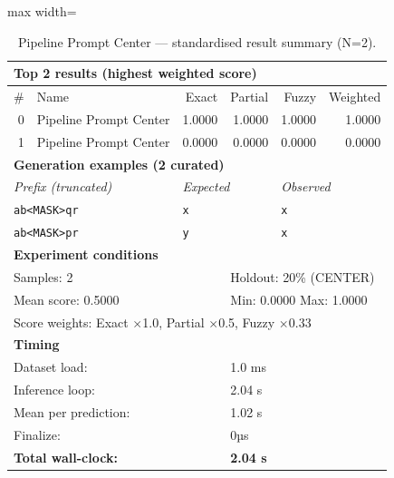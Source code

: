 \begin{table}[htbp]
\centering
\caption{Pipeline Prompt Center — standardised result summary (N=2).}
\label{tab:pipeline_prompt_center_summary}
\begin{adjustbox}{max width=\textwidth}
\begin{tabular}{r p{5cm} r r r r}
\toprule
\multicolumn{6}{l}{\textbf{Top 2 results (highest weighted score)}} \\
\midrule
\# & Name & Exact & Partial & Fuzzy & Weighted \\
\midrule
0 & Pipeline Prompt Center & 1.0000 & 1.0000 & 1.0000 & 1.0000 \\
1 & Pipeline Prompt Center & 0.0000 & 0.0000 & 0.0000 & 0.0000 \\
\midrule
\multicolumn{6}{l}{\textbf{Generation examples (2 curated)}} \\
\midrule
\multicolumn{2}{l}{\textit{Prefix (truncated)}} & \multicolumn{2}{l}{\textit{Expected}} & \multicolumn{2}{l}{\textit{Observed}} \\
\midrule
\multicolumn{2}{l}{\texttt{ab<MASK>qr}} & \multicolumn{2}{l}{\texttt{x}} & \multicolumn{2}{l}{\texttt{x}} \\
\multicolumn{2}{l}{\texttt{ab<MASK>pr}} & \multicolumn{2}{l}{\texttt{y}} & \multicolumn{2}{l}{\texttt{x}} \\
\midrule
\multicolumn{6}{l}{\textbf{Experiment conditions}} \\
\midrule
\multicolumn{3}{l}{Samples: 2} & \multicolumn{3}{l}{Holdout: 20\% (CENTER)} \\
\multicolumn{3}{l}{Mean score: 0.5000} & \multicolumn{3}{l}{Min: 0.0000 \quad Max: 1.0000} \\
\multicolumn{6}{l}{Score weights: Exact $\times$1.0, Partial $\times$0.5, Fuzzy $\times$0.33} \\
\midrule
\multicolumn{6}{l}{\textbf{Timing}} \\
\midrule
\multicolumn{3}{l}{Dataset load:} & \multicolumn{3}{l}{1.0 ms} \\
\multicolumn{3}{l}{Inference loop:} & \multicolumn{3}{l}{2.04 s} \\
\multicolumn{3}{l}{Mean per prediction:} & \multicolumn{3}{l}{1.02 s} \\
\multicolumn{3}{l}{Finalize:} & \multicolumn{3}{l}{0µs} \\
\multicolumn{3}{l}{\textbf{Total wall-clock:}} & \multicolumn{3}{l}{\textbf{2.04 s}} \\
\bottomrule
\end{tabular}
\end{adjustbox}
\end{table}
